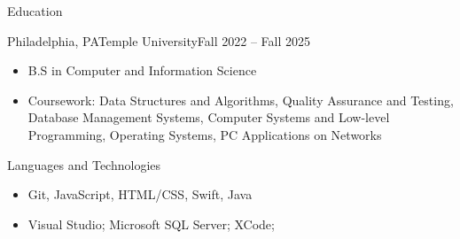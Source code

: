 \documentclass[]{mcdowellcv}
\begin{document}
	\begin{cvsection}{Education}
		\begin{cvsubsection}{Philadelphia, PA}{Temple University}{Fall 2022 -- Fall 2025}
			\begin{itemize}
				\item B.S in Computer and Information Science
				\item Coursework: Data Structures and Algorithms, Quality Assurance and Testing, Database Management Systems, Computer Systems and Low-level Programming, Operating Systems, PC Applications on Networks
			\end{itemize}
		\end{cvsubsection}
	\end{cvsection}

	
	\begin{cvsection}{Languages and Technologies}
		\begin{cvsubsection}{}{}{}	
			\begin{itemize}
				\item Git, JavaScript, HTML/CSS, Swift, Java
				\item Visual Studio; Microsoft SQL Server; XCode; 
			\end{itemize}
		\end{cvsubsection}
	\end{cvsection}
	
\end{document}
